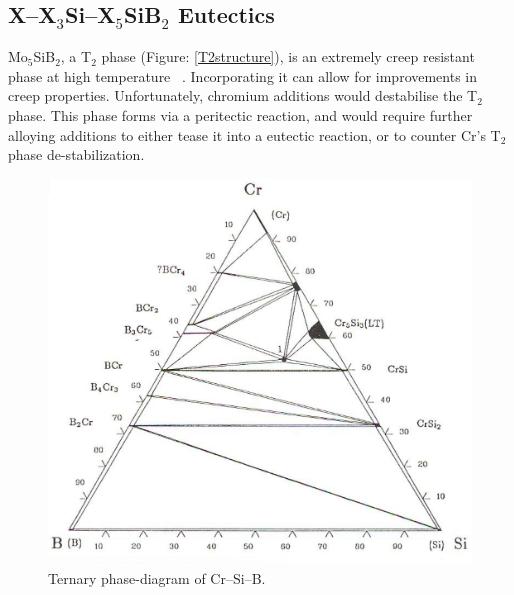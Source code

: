 

\subsection{X--X$_3$Si--X$_5$SiB$_2$ Eutectics}

Mo$_5$SiB$_2$, a T$_2$ phase (Figure: \ref{T2structure}), is an extremely creep resistant phase at high temperature ~\cite{rawn01}. Incorporating it can allow for improvements in creep properties. Unfortunately, chromium additions would destabilise the T$_2$ phase. This phase forms via a peritectic reaction, and would require further alloying additions to either tease it into a eutectic reaction, or to counter Cr's T$_2$ phase de-stabilization. 
%
\begin{figure}[H]
\begin{center}
\includegraphics{CrSiB}
\caption{Ternary phase-diagram of Cr--Si--B.}\label{fig:CrSiB}
\end{center}
\end{figure}
%

